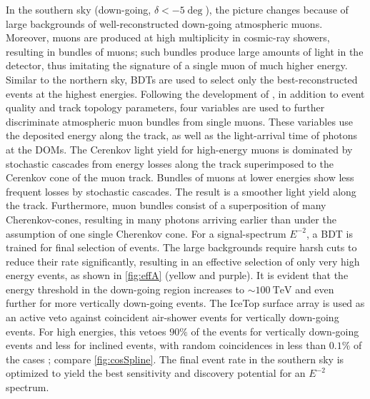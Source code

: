 \documentclass[aps,10pt,prd,twocolumn,floats,letterpaper,showpacs,nofootinbib,bibnotes,notitlepage,superscriptaddress]{revtex4-1}
\begin{document}
In the southern sky (down-going, $\delta<-5\deg$), the picture changes because
of large backgrounds of well-reconstructed down-going atmospheric muons.
Moreover, muons are produced at high multiplicity in cosmic-ray showers,
resulting in bundles of muons; such bundles produce large amounts of light in
the detector, thus imitating the signature of a single muon of much higher
energy. Similar to the northern sky, BDTs are used to select only the
best-reconstructed events at the highest energies. Following the development of
\cite{Aartsen:2014cva}, in addition to event quality and track topology
parameters, four variables are used to further discriminate atmospheric
muon bundles from single muons. These variables use the deposited energy along
the track, as well as the light-arrival time of photons at the DOMs. The
Cerenkov light yield for high-energy muons is dominated by stochastic cascades
from energy losses along the track superimposed to the Cerenkov cone of the
muon track. Bundles of muons at lower energies show less frequent losses by
stochastic cascades. The result is a smoother light yield along the
track. Furthermore, muon bundles consist of a superposition of many
Cherenkov-cones, resulting in many photons arriving earlier than under the
assumption of one single Cherenkov cone. For a signal-spectrum $E^{-2}$, a BDT
is trained for final selection of events. The large backgrounds require harsh
cuts to reduce their rate significantly, resulting in an effective selection of
only very high energy events, as shown in \ref{fig:effA} (yellow and
purple).  It is evident that the energy threshold in the down-going region
increases to $\sim100\:\mathrm{TeV}$ and even further for more vertically
down-going events. The IceTop surface array is used as an active veto against
coincident air-shower events for vertically down-going events.  For
high energies, this vetoes $90\%$ of the events for vertically down-going
events and less for inclined events, with random coincidences in less than
$0.1\%$ of the cases \citep{Aartsen:2013uuv}; compare \ref{fig:cosSpline}.
The final event rate in the southern sky is optimized to yield the best
sensitivity and discovery potential for an $E^{-2}$ spectrum.
\end{document}
